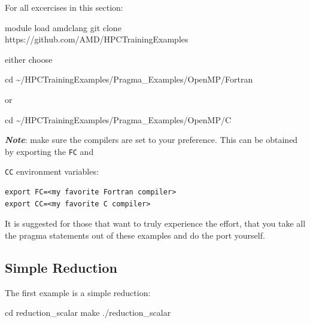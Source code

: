 \documentclass[
]{article}
\let\oldtexttt\texttt
\renewcommand{\texttt}[1]{
  \colorbox{Light}{\oldtexttt{#1}}
}
\newenvironment{Shaded}{}{}
\newcommand{\BuiltInTok}[1]{#1}
\newcommand{\ExtensionTok}[1]{#1}
\newcommand{\FunctionTok}[1]{\textcolor[rgb]{0.02,0.16,0.49}{#1}}
\newcommand{\NormalTok}[1]{#1}
\begin{document}
For all excercises in this section:

\begin{Shaded}
\begin{Highlighting}[]
\ExtensionTok{module}\NormalTok{ load amdclang}
\FunctionTok{git}\NormalTok{ clone https://github.com/AMD/HPCTrainingExamples}
\end{Highlighting}
\end{Shaded}

either choose

\begin{Shaded}
\begin{Highlighting}[]
\BuiltInTok{cd}\NormalTok{ \textasciitilde{}/HPCTrainingExamples/Pragma\_Examples/OpenMP/Fortran}
\end{Highlighting}
\end{Shaded}

or

\begin{Shaded}
\begin{Highlighting}[]
\BuiltInTok{cd}\NormalTok{ \textasciitilde{}/HPCTrainingExamples/Pragma\_Examples/OpenMP/C}
\end{Highlighting}
\end{Shaded}

\textbf{\emph{Note}}: make sure the compilers are set to your
preference. This can be obtained by exporting the \texttt{FC} and
\texttt{CC} environment variables:

\begin{verbatim}
export FC=<my favorite Fortran compiler>
export CC=<my favorite C compiler>
\end{verbatim}

It is suggested for those that want to truly experience the effort, that
you take all the pragma statements out of these examples and do the port
yourself.

\hypertarget{simple-reduction}{%
\subsection{Simple Reduction}\label{simple-reduction}}

The first example is a simple reduction:

\begin{Shaded}
\begin{Highlighting}[]
\BuiltInTok{cd}\NormalTok{ reduction\_scalar}
\FunctionTok{make}
\ExtensionTok{./reduction\_scalar}
\end{Highlighting}
\end{Shaded}
\end{document}
